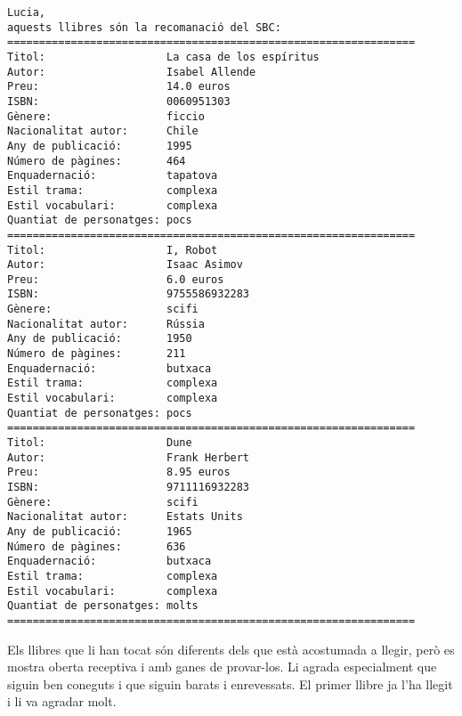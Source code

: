 \begin{verbatim}
Lucia, 
aquests llibres són la recomanació del SBC: 
================================================================
Titol:                   La casa de los espíritus
Autor:                   Isabel Allende
Preu:                    14.0 euros
ISBN:                    0060951303
Gènere:                  ficcio
Nacionalitat autor:      Chile
Any de publicació:       1995
Número de pàgines:       464
Enquadernació:           tapatova
Estil trama:             complexa
Estil vocabulari:        complexa
Quantiat de personatges: pocs
================================================================
Titol:                   I, Robot
Autor:                   Isaac Asimov
Preu:                    6.0 euros
ISBN:                    9755586932283
Gènere:                  scifi
Nacionalitat autor:      Rússia
Any de publicació:       1950
Número de pàgines:       211
Enquadernació:           butxaca
Estil trama:             complexa
Estil vocabulari:        complexa
Quantiat de personatges: pocs
================================================================
Titol:                   Dune
Autor:                   Frank Herbert
Preu:                    8.95 euros
ISBN:                    9711116932283
Gènere:                  scifi
Nacionalitat autor:      Estats Units
Any de publicació:       1965
Número de pàgines:       636
Enquadernació:           butxaca
Estil trama:             complexa
Estil vocabulari:        complexa
Quantiat de personatges: molts
================================================================
\end{verbatim}


Els llibres que li han tocat són diferents dels que està acostumada a llegir, però es mostra oberta receptiva i amb ganes de provar-los.
Li agrada especialment que siguin ben coneguts i que siguin barats i enrevessats. El primer llibre ja l'ha llegit i li va agradar molt.
